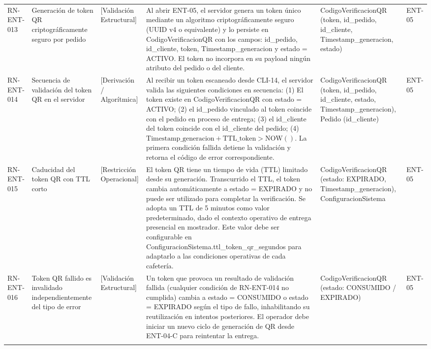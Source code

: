 \begin{landscape}
\begin{longtable}[c]{l p{2.1cm} p{2.1cm} p{8cm} p{4cm} p{3cm}}
RN-ENT-013 & Generación de token QR criptográficamente seguro por pedido & [Validación Estructural] & Al abrir ENT-05, el servidor genera un token único mediante un algoritmo criptográficamente seguro (UUID v4 o equivalente) y lo persiste en CodigoVerificacionQR con los campos: id\_pedido, id\_cliente, token, Timestamp\_generacion y estado = ACTIVO. El token no incorpora en su payload ningún atributo del pedido o del cliente. & CodigoVerificacionQR (token, id\_pedido, id\_cliente, Timestamp\_generacion, estado) & ENT-05 \\
\addlinespace
RN-ENT-014 & Secuencia de validación del token QR en el servidor & [Derivación / Algorítmica] & Al recibir un token escaneado desde CLI-14, el servidor valida las siguientes condiciones en secuencia: (1) El token existe en CodigoVerificacionQR con estado = ACTIVO; (2) el id\_pedido vinculado al token coincide con el pedido en proceso de entrega; (3) el id\_cliente del token coincide con el id\_cliente del pedido; (4) $\text{Timestamp\_generacion} + \text{TTL\_token} > \text{NOW}()$. La primera condición fallida detiene la validación y retorna el código de error correspondiente. & CodigoVerificacionQR (token, id\_pedido, id\_cliente, estado, Timestamp\_generacion), Pedido (id\_cliente) & ENT-05 \\
\addlinespace
RN-ENT-015 & Caducidad del token QR con TTL corto & [Restricción Operacional] & El token QR tiene un tiempo de vida (TTL) limitado desde su generación. Transcurrido el TTL, el token cambia automáticamente a estado = EXPIRADO y no puede ser utilizado para completar la verificación. Se adopta un TTL de 5 minutos como valor predeterminado, dado el contexto operativo de entrega presencial en mostrador. Este valor debe ser configurable en ConfiguracionSistema.ttl\_token\_qr\_segundos para adaptarlo a las condiciones operativas de cada cafetería. & CodigoVerificacionQR (estado: EXPIRADO, Timestamp\_generacion), ConfiguracionSistema & ENT-05 \\
\addlinespace
RN-ENT-016 & Token QR fallido es invalidado independientemente del tipo de error & [Validación Estructural] & Un token que provoca un resultado de validación fallida (cualquier condición de RN-ENT-014 no cumplida) cambia a estado = CONSUMIDO o estado = EXPIRADO según el tipo de fallo, inhabilitando su reutilización en intentos posteriores. El operador debe iniciar un nuevo ciclo de generación de QR desde ENT-04-C para reintentar la entrega. & CodigoVerificacionQR (estado: CONSUMIDO / EXPIRADO) & ENT-05 \\
\addlinespace

\end{longtable}
\end{landscape}
